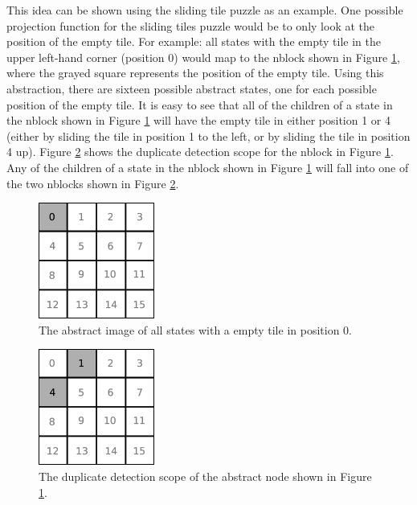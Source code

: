 \documentclass{article} \usepackage{aaai} \usepackage{graphicx}
\begin{document}
This idea can be shown using the sliding tile puzzle as an example.
One possible projection function for the sliding tiles puzzle would be
to only look at the position of the empty tile.  For example: all
states with the empty tile in the upper left-hand corner (position 0)
would map to the nblock shown in Figure \ref{fig:tile-abstraction},
where the grayed square represents the position of the empty tile.
Using this abstraction, there are sixteen possible abstract states,
one for each possible position of the empty tile.  It is easy to see
that all of the children of a state in the nblock shown in Figure
\ref{fig:tile-abstraction} will have the empty tile in either position
1 or 4 (either by sliding the tile in position 1 to the left, or by
sliding the tile in position 4 up).  Figure
\ref{fig:duplicate-detection-scope} shows the duplicate detection
scope for the nblock in Figure \ref{fig:tile-abstraction}.  Any of the
children of a state in the nblock shown in Figure
\ref{fig:tile-abstraction} will fall into one of the two nblocks shown
in Figure \ref{fig:duplicate-detection-scope}.

\begin{figure}[t]
\begin{center}
\includegraphics[width=1.5in]{images/tile-abstraction.eps}
\caption{The abstract image of all states with a empty tile in
  position 0.}
\label{fig:tile-abstraction}
\end{center}
\end{figure}

\begin{figure}[t]
\begin{center}
\includegraphics[width=1.5in]{images/duplicate-detection-scope.eps}
\caption{The duplicate detection scope of the abstract node shown in
  Figure \ref{fig:tile-abstraction}.}
\label{fig:duplicate-detection-scope}
\end{center}
\end{figure}
\end{document}
